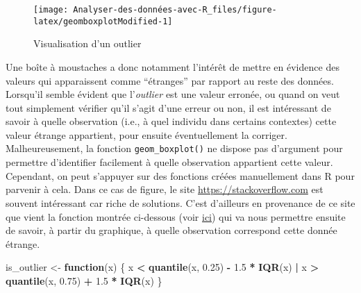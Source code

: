 \documentclass[
  french,
]{book}
\newenvironment{Shaded}{\begin{snugshade}}{\end{snugshade}}
\newcommand{\ControlFlowTok}[1]{\textcolor[rgb]{0.13,0.29,0.53}{\textbf{#1}}}
\newcommand{\FloatTok}[1]{\textcolor[rgb]{0.00,0.00,0.81}{#1}}
\newcommand{\KeywordTok}[1]{\textcolor[rgb]{0.13,0.29,0.53}{\textbf{#1}}}
\newcommand{\NormalTok}[1]{#1}
\newcommand{\OperatorTok}[1]{\textcolor[rgb]{0.81,0.36,0.00}{\textbf{#1}}}
\newcommand{\StringTok}[1]{\textcolor[rgb]{0.31,0.60,0.02}{#1}}
\begin{document}
\begin{figure}

{\centering \texttt{[image: Analyser-des-données-avec-R\_files/figure-latex/geomboxplotModified-1]} 

}

\caption{Visualisation d'un outlier}\label{fig:geomboxplotModified}
\end{figure}

Une boîte à moustaches a donc notamment l'intérêt de mettre en évidence des valeurs qui apparaissent comme ``étranges'' par rapport au reste des données. Lorsqu'il semble évident que l'\emph{outlier} est une valeur erronée, ou quand on veut tout simplement vérifier qu'il s'agit d'une erreur ou non, il est intéressant de savoir à quelle observation (i.e., à quel individu dans certains contextes) cette valeur étrange appartient, pour ensuite éventuellement la corriger. Malheureusement, la fonction \texttt{geom\_boxplot()} ne dispose pas d'argument pour permettre d'identifier facilement à quelle observation appartient cette valeur. Cependant, on peut s'appuyer sur des fonctions créées manuellement dans R pour parvenir à cela. Dans ce cas de figure, le site \url{https://stackoverflow.com} est souvent intéressant car riche de solutions. C'est d'ailleurs en provenance de ce site que vient la fonction montrée ci-dessous (voir \href{https://stackoverflow.com/questions/33524669/labeling-outliers-of-boxplots-in-r}{ici}) qui va nous permettre ensuite de savoir, à partir du graphique, à quelle observation correspond cette donnée étrange.

\begin{Shaded}
\begin{Highlighting}[]
\NormalTok{is_outlier <-}\StringTok{ }\ControlFlowTok{function}\NormalTok{(x) \{}
\NormalTok{  x }\OperatorTok{<}\StringTok{ }\KeywordTok{quantile}\NormalTok{(x, }\FloatTok{0.25}\NormalTok{) }\OperatorTok{-}\StringTok{ }\FloatTok{1.5} \OperatorTok{*}\StringTok{ }\KeywordTok{IQR}\NormalTok{(x) }\OperatorTok{|}\StringTok{ }\NormalTok{x }\OperatorTok{>}\StringTok{ }\KeywordTok{quantile}\NormalTok{(x, }\FloatTok{0.75}\NormalTok{) }\OperatorTok{+}\StringTok{ }\FloatTok{1.5} \OperatorTok{*}\StringTok{ }\KeywordTok{IQR}\NormalTok{(x)}
\NormalTok{\}}
\end{Highlighting}
\end{Shaded}
\end{document}
